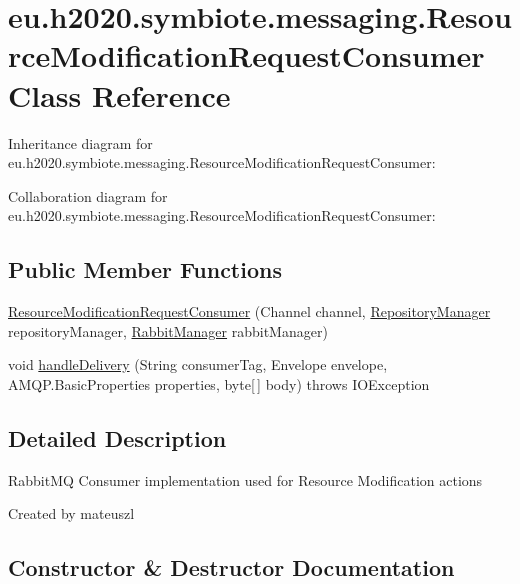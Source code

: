 \hypertarget{classeu_1_1h2020_1_1symbiote_1_1messaging_1_1ResourceModificationRequestConsumer}{}\section{eu.\+h2020.\+symbiote.\+messaging.\+Resource\+Modification\+Request\+Consumer Class Reference}
\label{classeu_1_1h2020_1_1symbiote_1_1messaging_1_1ResourceModificationRequestConsumer}


Inheritance diagram for eu.\+h2020.\+symbiote.\+messaging.\+Resource\+Modification\+Request\+Consumer\+:


Collaboration diagram for eu.\+h2020.\+symbiote.\+messaging.\+Resource\+Modification\+Request\+Consumer\+:
\subsection*{Public Member Functions}
\begin{DoxyCompactItemize}
\item 
\hyperlink{classeu_1_1h2020_1_1symbiote_1_1messaging_1_1ResourceModificationRequestConsumer_a9edfd7dcca58ed1988bd26d9dd913191}{Resource\+Modification\+Request\+Consumer} (Channel channel, \hyperlink{classeu_1_1h2020_1_1symbiote_1_1repository_1_1RepositoryManager}{Repository\+Manager} repository\+Manager, \hyperlink{classeu_1_1h2020_1_1symbiote_1_1messaging_1_1RabbitManager}{Rabbit\+Manager} rabbit\+Manager)
\item 
void \hyperlink{classeu_1_1h2020_1_1symbiote_1_1messaging_1_1ResourceModificationRequestConsumer_a814265326818232c50a1b91a4b6e347b}{handle\+Delivery} (String consumer\+Tag, Envelope envelope, A\+M\+Q\+P.\+Basic\+Properties properties, byte\mbox{[}$\,$\mbox{]} body)  throws I\+O\+Exception 
\end{DoxyCompactItemize}


\subsection{Detailed Description}
Rabbit\+MQ Consumer implementation used for Resource Modification actions

Created by mateuszl 

\subsection{Constructor \& Destructor Documentation}
